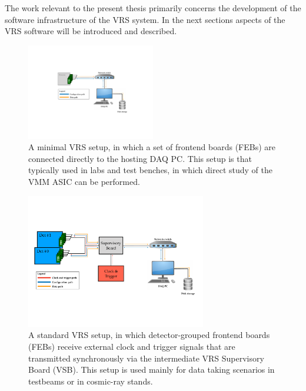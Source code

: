 The work relevant to the present thesis primarily concerns the development of the software
infrastructure of the VRS system.
In the next sections aspects of the VRS software will be introduced and described.

\begin{figure}[!htb]
    \begin{center}
        \includegraphics[width=0.5\textwidth]{figures/nsw/vrs/vrs_diagram_minimalPDF}
        \caption{
            A minimal VRS setup, in which a set of frontend boards (FEBs) are connected directly
            to the hosting DAQ PC.
            This setup is that typically used in labs and test benches, in which direct
            study of the VMM ASIC can be performed.
        }
        \label{fig:vrs_diagram_minimal}
    \end{center}
\end{figure}

\begin{figure}[!htb]
    \begin{center}
        \includegraphics[width=0.7\textwidth]{figures/nsw/vrs/vrs_diagramPDF}
        \caption{
            A standard VRS setup, in which detector-grouped frontend boards (FEBs) receive external clock
            and trigger signals that are transmitted synchronously via the intermediate VRS Supervisory Board (VSB).
            This setup is used mainly for data taking scenarios in testbeams or in cosmic-ray stands.
        }
        \label{fig:vrs_diagram}
    \end{center}
\end{figure}
\FloatBarrier

